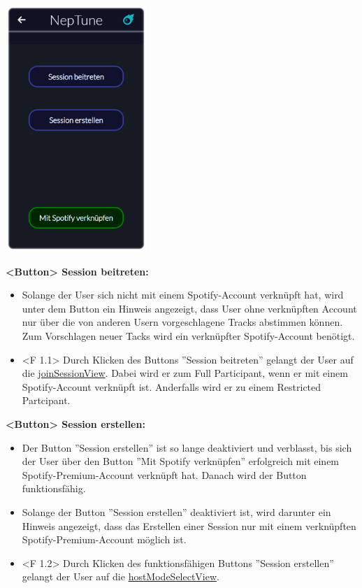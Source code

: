 \documentclass[oneside, ngerman]{sdqtechreport}
\begin{document}
\begin{center}
    \hypertarget{startView}{}
    \includegraphics[width=0.4\textwidth]{LATEX/Pflichtenheft/GraphicDesigns/startPage.png}
\end{center}

\textbf{<Button> Session beitreten:}
\begin{itemize}
    \item Solange der User sich nicht mit einem Spotify-Account verknüpft hat, wird unter dem Button ein Hinweis angezeigt, dass User ohne verknüpften Account nur über die von anderen Usern vorgeschlagene Tracks abstimmen können. Zum Vorschlagen neuer Tacks wird ein verknüpfter Spotify-Account benötigt.
    \item <F 1.1> Durch Klicken des Buttons ''Session beitreten'' gelangt der User auf die \hyperlink{joinSessionView}{joinSessionView}. Dabei wird er zum Full Participant, wenn er mit einem Spotify-Account verknüpft ist. Anderfalls wird er zu einem Restricted Partcipant.
\end{itemize}

\textbf{<Button> Session erstellen:}
\begin{itemize}
    \item Der Button ''Session erstellen'' ist so lange deaktiviert und verblasst, bis sich der User über den Button ''Mit Spotify verknüpfen'' erfolgreich mit einem Spotify-Premium-Account verknüpft hat. Danach wird der Button funktionsfähig.
    \item Solange der Button ''Session erstellen'' deaktiviert ist, wird darunter ein Hinweis angezeigt, dass das Erstellen einer Session nur mit einem verknüpften Spotify-Premium-Account möglich ist.
    \item <F 1.2> Durch Klicken des funktionsfähigen Buttons ''Session erstellen'' gelangt der User auf die \hyperlink{hostModeSelectView}{hostModeSelectView}.
\end{itemize}
\end{document}
